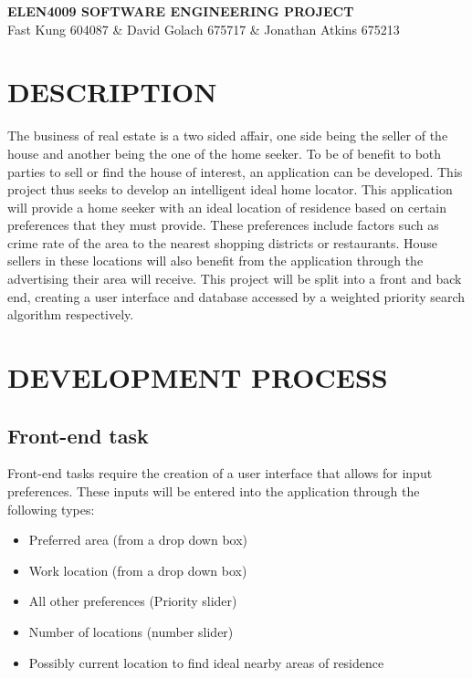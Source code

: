	\pagestyle{plain}
	\setcounter{page}{1}
	\newpage
	
	{\large {\textbf{ELEN4009 SOFTWARE ENGINEERING PROJECT\\}Fast Kung 604087 \& David Golach 675717 \& Jonathan Atkins 675213}
	}
	\section{DESCRIPTION}

	The business of real estate is a two sided affair, one side being the seller of the house and another being the one of the home seeker. To be of benefit to both parties to sell or find the house of interest, an application can be developed. This project thus seeks to develop an intelligent ideal home locator. This application will provide a home seeker with an ideal location of residence based on certain preferences that they must provide. These preferences include factors such as crime rate of the area to the nearest shopping districts or restaurants. House sellers in these locations will also benefit from the application through the advertising their area will receive. This project will be split into a front and back end, creating a user interface and database accessed by a weighted priority search algorithm respectively.
	 
	\section{DEVELOPMENT PROCESS}
	
	\subsection{Front-end task}
	
	Front-end tasks require the creation of a user interface that allows for input preferences. These inputs will be entered into the application through the following types:
	
	\begin{itemize}
		\item Preferred area (from a drop down box) 
		\item Work location (from a drop down box)
		\item All other preferences (Priority slider)
		\item Number of locations (number slider)
		\item Possibly current location to find ideal nearby areas of residence
	\end{itemize}
	
